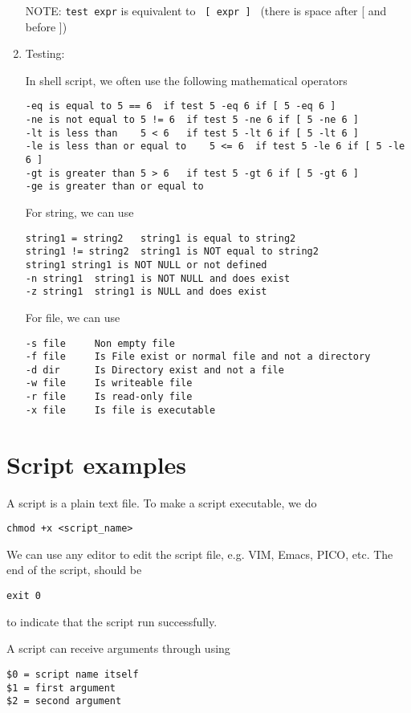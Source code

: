 \begin{enumerate}
NOTE: \verb!test expr! is equivalent to \verb! [ expr ] ! (there is
space after [ and before ])


\item Testing:

In shell script, we often use the following mathematical operators
\begin{verbatim}
-eq	is equal to	5 == 6	if test 5 -eq 6	if [ 5 -eq 6 ]
-ne	is not equal to	5 != 6	if test 5 -ne 6	if [ 5 -ne 6 ]
-lt	is less than	5 < 6	if test 5 -lt 6	if [ 5 -lt 6 ]
-le	is less than or equal to	5 <= 6	if test 5 -le 6	if [ 5 -le 6 ]
-gt	is greater than	5 > 6	if test 5 -gt 6	if [ 5 -gt 6 ]
-ge	is greater than or equal to
\end{verbatim}

For string, we can use
\begin{verbatim}
string1 = string2	string1 is equal to string2
string1 != string2	string1 is NOT equal to string2
string1	string1 is NOT NULL or not defined 
-n string1	string1 is NOT NULL and does exist
-z string1	string1 is NULL and does exist
\end{verbatim}

For file, we can use
\begin{verbatim}
-s file   	Non empty file
-f file   	Is File exist or normal file and not a directory 
-d dir    	Is Directory exist and not a file
-w file  	Is writeable file
-r file   	Is read-only file
-x file   	Is file is executable
\end{verbatim}

\end{enumerate}

\section{Script examples}

A script is a plain text file. To make a script executable, we do
\begin{verbatim}
chmod +x <script_name>
\end{verbatim}
We can use any editor to edit the script file, e.g. VIM, Emacs, PICO, etc. The
end of the script, should be 
\begin{verbatim}
exit 0
\end{verbatim}
to indicate that the script run successfully.

A script can receive arguments through using 
\begin{verbatim}
$0 = script name itself
$1 = first argument
$2 = second argument
\end{verbatim}

